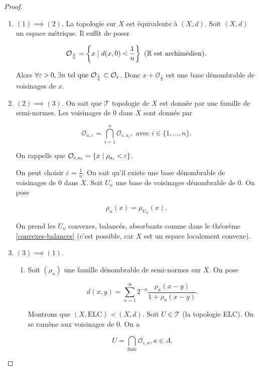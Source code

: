 \documentclass[french]{book}
\newcommand{\lesss}{\rotatebox[origin=c]{90}{$\land$}}
\newcommand{\less}{\ \lesss\ }
\newcommand{\biggg}{\rotatebox[origin=c]{90}{$\lor$}}
\newcommand{\bg}{\ \biggg\ }
\begin{document}
\begin{proof}
  \begin{enumerate}
    \item \((1) \implies (2)\). La topologie sur \(X\) est équivalente à \((X,d)\). Soit \((X,d)\) un espace métrique. Il suffit de poser

    \[\mathcal{O} _{\frac{1}{n}} = \left\{ x \mid d(x,0) \less \frac{1}{n}\right\} \ (\mathbb{R} \text{ est archimédien}). \]

    Alors \(\forall \varepsilon \bg 0, \exists n \text{ tel que } \mathcal{O} _{\frac{1}{n}} \subset \mathcal{O} _{\varepsilon}\). Donc \(x + \mathcal{O} _{\frac{1}{n}}\) est une base dénombrable de voisinages de \(x\).

    \item \((2) \implies (3)\). On sait que \(\mathscr{T}\) topologie de \(X\) est donnée par une famille de semi-normes. Les voisinages de 0 dans \(X\) sont donnés par

    \[\mathcal{O} _{a, \varepsilon} = \bigcap _{i=1} ^{n} \mathcal{O} _{\varepsilon, a_i}, \text{ avec } i \in \{ 1, \dots, n \}.\]

    On rappelle que \(\mathcal{O} _{\varepsilon,a_i} = \{ x \mid \rho _{a_i} \less \varepsilon \}\).

    On peut choisir \(\varepsilon = \frac{1}{n}\). On sait qu'il existe une base dénombrable de voisinages de 0 dans \(X\). Soit \(U_n\) une base de voisinages dénombrable de 0. On pose

    \[\rho_n(x) = \mu _{U_n}(x).\]

    On prend les \(U_n\) convexes, balancés, absorbants comme dans le théorème \ref{convexes-balances} (c'est possible, car \(X\) est un espace localement convexe).

    \item \((3) \implies (1)\).

    \begin{enumerate}
      \item Soit \( (\rho_n)\) une famille dénombrable de semi-normes sur \(X\). On pose

      \[d(x,y) = \sum_{n=1}^{\infty} 2 ^{-n} \frac{\rho_n(x-y)}{1 + \rho_n(x-y)}.\]

      Montrons que \((X, \text{ELC}) \prec (X, d)\). Soit \(U \in \mathscr{T}\) (la topologie ELC). On se ramène aux voisinages de 0. On a

      \[U = \bigcap _{\text{finie}} \mathcal{O} _{\varepsilon, a}, a \in A. \]


\end{enumerate}
\end{enumerate}
\end{proof}
\end{document}
